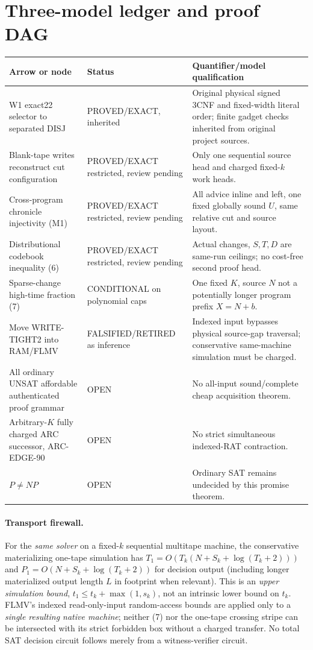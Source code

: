 \documentclass[11pt]{article}
\begin{document}
\section{Three-model ledger and proof DAG}
\begin{center}\small
\begin{tabularx}{\linewidth}{p{.23\linewidth}p{.20\linewidth}X}
\toprule
Arrow or node & Status & Quantifier/model qualification\\ \midrule
W1 exact22 selector to separated DISJ & PROVED/EXACT, inherited &
Original physical signed 3CNF and fixed-width literal order;
finite gadget checks inherited from original project sources.\\
Blank-tape writes reconstruct cut configuration &
PROVED/EXACT restricted, review pending &
Only one sequential source head and charged fixed-$k$ work heads.\\
Cross-program chronicle injectivity (M1) &
PROVED/EXACT restricted, review pending &
All advice inline and left, one fixed globally sound $U$,
same relative cut and source layout.\\
Distributional codebook inequality (6) &
PROVED/EXACT restricted, review pending &
Actual changes, $S,T,D$ are same-run ceilings;
no cost-free second proof head.\\
Sparse-change high-time fraction (7) &
CONDITIONAL on polynomial caps &
One fixed $K$, source $N$ not a potentially longer program
prefix $X=N+b$.\\
Move WRITE-TIGHT2 into RAM/FLMV &
FALSIFIED/RETIRED as inference &
Indexed input bypasses physical source-gap traversal;
conservative same-machine simulation must be charged.\\
All ordinary UNSAT affordable authenticated proof grammar &
OPEN & No all-input sound/complete cheap acquisition theorem.\\
Arbitrary-$K$ fully charged ARC successor, ARC-EDGE-90 &
OPEN & No strict simultaneous indexed-RAT contraction.\\
$P\ne NP$ &
OPEN & Ordinary SAT remains undecided by this promise theorem.\\
\bottomrule
\end{tabularx}
\end{center}

\paragraph{Transport firewall.}
For the \emph{same solver} on a fixed-$k$ sequential multitape
machine, the conservative materializing one-tape simulation has
$T_1=O(T_k(N+S_k+\log(T_k+2)))$ and
$P_1=O(N+S_k+\log(T_k+2))$ for decision output
(including longer materialized output length $L$ in footprint when
relevant).  This is an \emph{upper simulation bound},
$t_1\le t_k+\max(1,s_k)$, not an intrinsic lower bound on
$t_k$.  FLMV's indexed read-only-input random-access bounds
are applied only to a \emph{single resulting native machine};
neither (7) nor the one-tape crossing stripe can be
intersected with its strict forbidden box without a charged
transfer.  No total SAT decision circuit follows merely from
a witness-verifier circuit.
\end{document}
